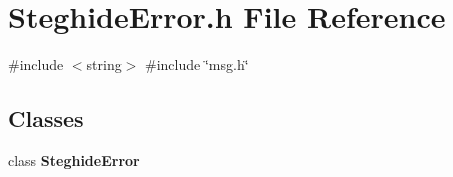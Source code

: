 \section{Steghide\+Error.\+h File Reference}
\label{SteghideError_8h}
{\ttfamily \#include $<$string$>$}\newline
{\ttfamily \#include \char`\"{}msg.\+h\char`\"{}}\newline
\subsection*{Classes}
\begin{DoxyCompactItemize}
\item 
class \textbf{ Steghide\+Error}
\end{DoxyCompactItemize}
